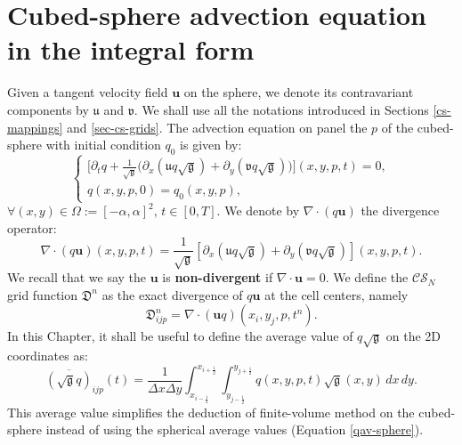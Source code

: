 \section{Cubed-sphere advection equation in the integral form}
\label{chp-cs-adv}
Given a tangent velocity field $\boldsymbol{u}$ on the sphere, we denote its
contravariant components by $\mathfrak{u}$ and $\mathfrak{v}$.
We shall use all the notations introduced in Sections \ref{cs-mappings} and \ref{sec-cs-grids}.
The advection equation on panel the $p$ of the cubed-sphere with initial condition $q_0$ is given by:
\begin{equation}
	\begin{cases}
		\label{eq1-adv-cs}
		\bigg[{\partial}_t{q}+
		\frac{1}{\sqrt{\mathfrak{g}}}\bigg(
		{\partial}_x{(\mathfrak{u} q \sqrt{\mathfrak{g}})}+
		{\partial}_y{(\mathfrak{v} q \sqrt{\mathfrak{g}})}
		\bigg)\bigg](x,y,p,t)
		= 0,\\
		q(x,y,p,0) = q_0(x,y,p),
	\end{cases}
\end{equation}
$\forall (x,y) \in \Omega := [-\alpha,\alpha]^2$, $t\in[0,T]$.
We denote by $\nabla \cdot (q\boldsymbol{u})$ the divergence operator:
\begin{equation}
	\label{advcs:eqdiv}
	\nabla \cdot (q\boldsymbol{u})(x, y, p, t) =  \frac{1}{\sqrt{\mathfrak{g}}}
	[{\partial_x (\mathfrak{u}q\sqrt{\mathfrak{g}})} + {\partial_y (\mathfrak{v}q\sqrt{\mathfrak{g}})}](x, y, p, t).
\end{equation}
We recall that we say the $\boldsymbol{u}$ is \textbf{non-divergent} if $\nabla \cdot \boldsymbol{u}=0$.
We define the $\mathcal{CS}_N$ grid function $\mathfrak{D}^n$ as
the exact divergence of $q\boldsymbol{u}$ at the cell centers, namely
\begin{equation}
	\label{cs-discrete-div}
	\mathfrak{D}^n_{ijp} = \nabla \cdot (\boldsymbol{u}q)(x_i,y_j,p,t^n).
\end{equation}
In this Chapter, it shall be useful to define the average value of $q\sqrt{\mathfrak{g}}$ on the 2D coordinates as:
\begin{equation}
\label{cs-q-av}
\overline{(\sqrt{\mathfrak{g}}q)}_{ijp}(t) = \frac{1}{\Delta x \Delta y}
\int_{x_{i-\frac{1}{2}}}^{x_{i+\frac{1}{2}}}
\int_{y_{j-\frac{1}{2}}}^{y_{j+\frac{1}{2}}}  q(x,y,p,t) {\sqrt{\mathfrak{g}}(x,y)}\,dx \,dy.
\end{equation}
This average value simplifies the deduction of finite-volume method on the cubed-sphere instead of using the spherical average values (Equation \eqref{qav-sphere}).

